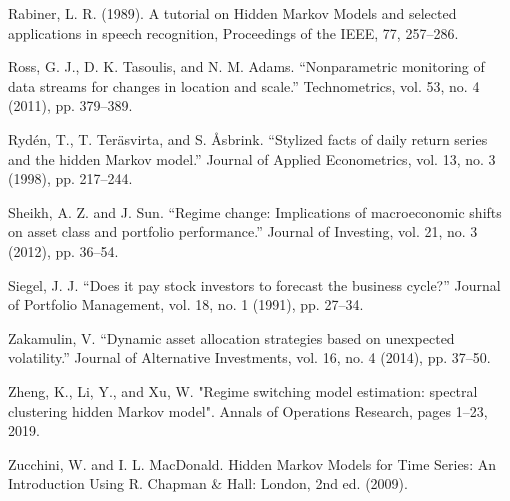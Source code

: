 Rabiner, L. R. (1989). A tutorial on Hidden Markov Models and selected applications in speech recognition, Proceedings of the IEEE, 77, 257–286.

Ross, G. J., D. K. Tasoulis, and N. M. Adams. “Nonparametric monitoring of data streams for changes in location and scale.” Technometrics, vol. 53, no. 4 (2011), pp. 379–389.

Rydén, T., T. Teräsvirta, and S. Åsbrink. “Stylized facts of daily return series and the hidden Markov model.” Journal of Applied Econometrics, vol. 13, no. 3 (1998), pp. 217–244.

Sheikh, A. Z. and J. Sun. “Regime change: Implications of macroeconomic shifts on asset class and portfolio performance.” Journal of Investing, vol. 21, no. 3 (2012), pp. 36–54.

Siegel, J. J. “Does it pay stock investors to forecast the business cycle?” Journal of Portfolio Management, vol. 18, no. 1 (1991), pp. 27–34.

Zakamulin, V. “Dynamic asset allocation strategies based on unexpected volatility.” Journal of Alternative Investments, vol. 16, no. 4 (2014), pp. 37–50.

Zheng, K., Li, Y., and Xu, W. "Regime switching model estimation: spectral clustering hidden Markov model". Annals of Operations Research, pages 1–23, 2019.

Zucchini, W. and I. L. MacDonald. Hidden Markov Models for Time Series: An Introduction Using R. Chapman & Hall: London, 2nd ed. (2009).








